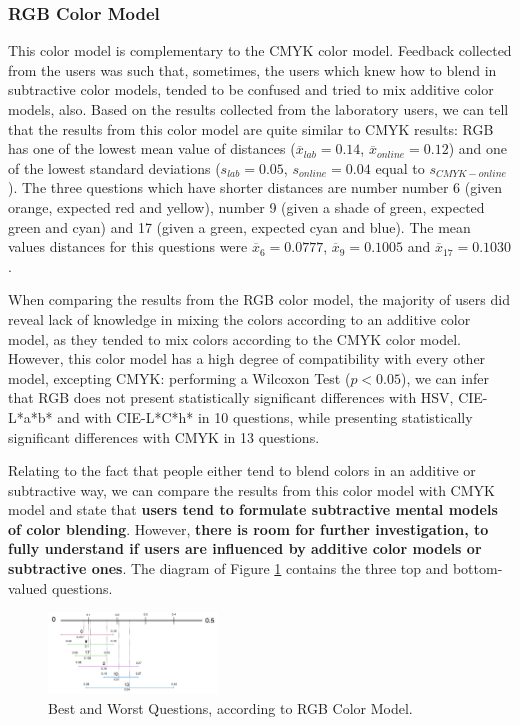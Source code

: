 \subsubsection{RGB Color Model}
%
This color model is complementary to the CMYK color model. Feedback collected from the users was such
that, sometimes, the users which knew how to blend in subtractive color models, tended to be confused
and tried to mix additive color models, also. Based on the results collected from the laboratory users,
we can tell that the results from this color model are quite similar to CMYK results: RGB has one of
the lowest mean value of distances ($\overline{x}_{lab} = 0.14$, $\overline{x}_{online} = 0.12$) and
one of the lowest standard deviations ($s_{lab} = 0.05$, $s_{online} = 0.04$ equal to $s_{CMYK-online}$).
The three questions which have shorter distances are number number 6 (given orange, expected red and
yellow), number 9 (given a shade of green, expected green and cyan) and 17 (given a green, expected
cyan and blue). The mean values distances for this questions were $\overline{x}_{6} = 0.0777$,
$\overline{x}_{9} = 0.1005$ and $\overline{x}_{17} = 0.1030$. \par
%
When comparing the results from the RGB color model, the majority of users did reveal lack of knowledge
in mixing the colors according to an additive color model, as they tended to mix colors according to the
CMYK color model. However, this color model has a high degree of compatibility with every other model,
excepting CMYK: performing a Wilcoxon Test ($p < 0.05$), we can infer that RGB does not present
statistically significant differences with HSV, CIE-L*a*b* and with CIE-L*C*h* in 10 questions, while
presenting statistically significant differences with CMYK in 13 questions. \par
%
Relating to the fact that people either tend to blend colors in an additive or subtractive way, we can
compare the results from this color model with CMYK model and state that \textbf{users tend to formulate
subtractive mental models of color blending}. However, \textbf{there is room for further investigation,
to fully understand if users are influenced by additive color models or subtractive ones}. The diagram
of Figure \ref{fig:rgb_analysis} contains the three top and bottom-valued questions.
%
\begin{figure}[!htbp]
  \centering
  \includegraphics[width=0.4\textwidth]{images/rgb_questions_analysis.png}
  \caption{Best and Worst Questions, according to RGB Color Model.}
  \label{fig:rgb_analysis}
\end{figure}
%
